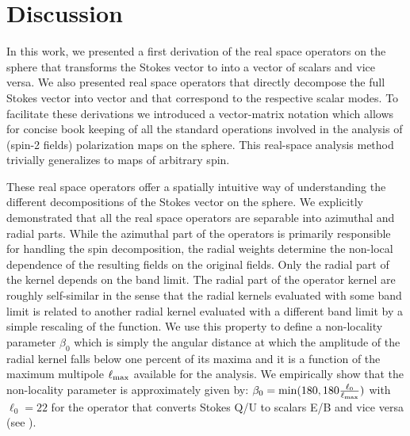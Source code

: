 \section{Discussion}\label{sec:discussion}
In this work, we presented a first derivation of the real space operators on the sphere that transforms the Stokes vector to into a vector of scalars and vice versa. We also presented real space operators that directly decompose the full Stokes vector \vp{} into vector  and  that correspond to the respective scalar modes.  To facilitate these derivations we introduced a vector-matrix notation which allows for concise book keeping of all the standard operations involved in the analysis of (spin-2 fields) polarization maps on the sphere. This real-space analysis method trivially generalizes to maps of arbitrary spin.


These real space operators offer a spatially intuitive way of understanding the different decompositions of the Stokes vector on the sphere. We explicitly  demonstrated that all the real space operators are separable into azimuthal and radial parts. While the azimuthal part of the operators is primarily responsible for handling the spin decomposition, the radial weights determine the non-local dependence of the resulting fields on the original fields.  Only the radial part of the kernel depends on the band limit. 
The radial part of the operator kernel are roughly self-similar in the sense that the radial kernels evaluated with some band limit is related to another radial kernel evaluated with a different band limit by a simple rescaling of the function. We use this property to define a non-locality parameter $\beta_0$ which is simply the angular distance at which the amplitude of the radial kernel falls below one percent of its maxima and it  is a function of the maximum multipole $\ell_{\rm max}$ available for the analysis. We empirically show that the non-locality parameter is approximately given by: $\beta_0 = \mathrm{min}(180, 180 \frac{\ell_{0}}{\ell_{\rm max}})$ with $\ell_{0}=22$ for the operator that converts Stokes Q/U to scalars E/B and vice versa (see ). 

